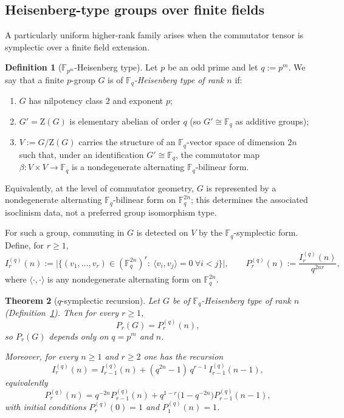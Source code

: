 \documentclass[11pt]{article}
\newtheorem{theorem}{Theorem}[section]
\theoremstyle{definition}
\newtheorem{definition}[theorem]{Definition}
\theoremstyle{remark}
\theoremstyle{definition}
\theoremstyle{plain}
\newcommand{\Z}{\mathrm{Z}}
\begin{document}
\subsection{Heisenberg-type groups over finite fields}\label{subsec:heisenberg}

A particularly uniform higher-rank family arises when the commutator tensor is symplectic over a finite field extension.

\begin{definition}[$\mathbb F_{p^m}$-Heisenberg type]\label{def:heisenberg-type}
Let $p$ be an odd prime and let $q:=p^m$.
We say that a finite $p$-group $G$ is of \emph{$\mathbb F_q$-Heisenberg type of rank $n$} if:
\begin{enumerate}
\item $G$ has nilpotency class $2$ and exponent $p$;
\item $G'=\Z(G)$ is elementary abelian of order $q$ (so $G'\cong \mathbb F_q$ as additive groups);
\item $V:=G/\Z(G)$ carries the structure of an $\mathbb F_q$-vector space of dimension $2n$ such that,
under an identification $G'\cong \mathbb F_q$, the commutator map
\(
\beta:V\times V\to \mathbb F_q
\)
is a nondegenerate alternating $\mathbb F_q$-bilinear form.
\end{enumerate}
Equivalently, at the level of commutator geometry, $G$ is represented by a nondegenerate alternating $\mathbb F_q$-bilinear form on $\mathbb F_q^{2n}$; this determines the associated isoclinism data, not a preferred group isomorphism type.
\end{definition}

For such a group, commuting in $G$ is detected on $V$ by the $\mathbb F_q$-symplectic form.
Define, for $r\ge 1$,
\[
I_r^{(q)}(n):=\big|\{(v_1,\dots,v_r)\in (\mathbb F_q^{2n})^r:\ \langle v_i,v_j\rangle=0\ \forall i<j\}\big|,
\qquad
P_r^{(q)}(n):=\frac{I_r^{(q)}(n)}{q^{2nr}},
\]
where $\langle\cdot,\cdot\rangle$ is any nondegenerate alternating form on $\mathbb F_q^{2n}$.

\begin{theorem}[$q$-symplectic recursion]\label{thm:qsymplectic-recursion}
Let $G$ be of $\mathbb F_q$-Heisenberg type of rank $n$ (Definition~\ref{def:heisenberg-type}).
Then for every $r\ge 1$,
\[
P_r(G)=P_r^{(q)}(n),
\]
so $P_r(G)$ depends only on $q=p^m$ and $n$.

Moreover, for every $n\ge 1$ and $r\ge 2$ one has the recursion
\[
I_r^{(q)}(n)=I_{r-1}^{(q)}(n)+(q^{2n}-1)\,q^{r-1}\,I_{r-1}^{(q)}(n-1),
\]
equivalently
\[
P_r^{(q)}(n)=q^{-2n}P_{r-1}^{(q)}(n)+q^{1-r}\bigl(1-q^{-2n}\bigr)P_{r-1}^{(q)}(n-1),
\]
with initial conditions $P_r^{(q)}(0)=1$ and $P_1^{(q)}(n)=1$.
\end{theorem}
\end{document}

